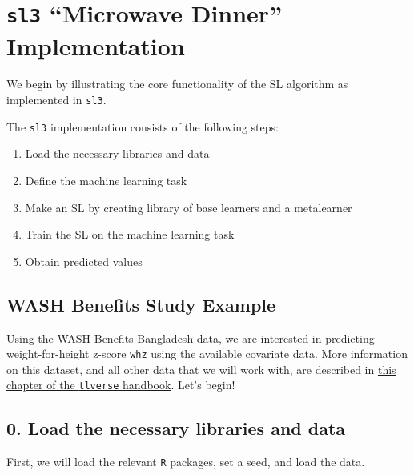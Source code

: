 \documentclass[
  12pt, krantz2,
]{book}
\newcommand{\passthrough}[1]{#1}
\providecommand{\tightlist}{%
  \setlength{\itemsep}{0pt}\setlength{\parskip}{0pt}}
\theoremstyle{definition}
\theoremstyle{definition}
\theoremstyle{definition}
\newcommand{\1}{\mathbbm{1}}
\begin{document}
\hypertarget{sl3-microwave-dinner-implementation}{%
\section*{\texorpdfstring{\texttt{sl3} ``Microwave Dinner'' Implementation}{sl3 ``Microwave Dinner'' Implementation}}\label{sl3-microwave-dinner-implementation}}


We begin by illustrating the core functionality of the SL algorithm as
implemented in \passthrough{\lstinline!sl3!}.

The \passthrough{\lstinline!sl3!} implementation consists of the following steps:

\begin{enumerate}
\def\labelenumi{\arabic{enumi}.}
\setcounter{enumi}{-1}
\tightlist
\item
  Load the necessary libraries and data
\item
  Define the machine learning task
\item
  Make an SL by creating library of base learners and a metalearner
\item
  Train the SL on the machine learning task
\item
  Obtain predicted values
\end{enumerate}

\hypertarget{wash-benefits-study-example}{%
\subsection*{WASH Benefits Study Example}\label{wash-benefits-study-example}}


Using the WASH Benefits Bangladesh data, we are interested in predicting
weight-for-height z-score \passthrough{\lstinline!whz!} using the available covariate data. More
information on this dataset, and all other data that we will work with, are
described in \href{ihttps://tlverse.org/tlverse-handbook/data.html}{this chapter of the \passthrough{\lstinline!tlverse!}
handbook}. Let's begin!

\hypertarget{load-the-necessary-libraries-and-data}{%
\subsection*{0. Load the necessary libraries and data}\label{load-the-necessary-libraries-and-data}}


First, we will load the relevant \passthrough{\lstinline!R!} packages, set a seed, and load the data.
\end{document}
